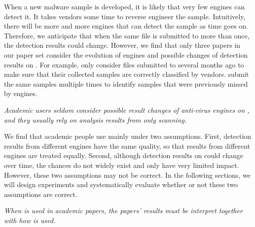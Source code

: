 When a new malware sample is developed, 
it is likely that very few engines can detect it. 
It takes vendors some time to reverse engineer the sample.
Intuitively, there will be more and more engines 
that can detect the sample as time goes on. 
Therefore, we anticipate that when the same file 
is submitted to \vt{} more than once,
the detection results could change. 
However, we find that only three papers in our paper set
consider the evolution of engines and possible 
changes of detection results on \vt{}. 
For example, \citet{neeles} only consider files submitted to \vt{} 
several months ago to make sure that their collected samples 
are correctly classified by \vt{} vendors. 
\citet{wressnegger2017looking} submit the same samples multiple 
times to identify samples that were previously missed by \vt{} engines.  

{\it{
Academic users seldom consider possible 
result changes of anti-virus engines on \vt{}, 
and they usually rely on analysis results from only \vt{} scanning. 
}}

We find that academic people use \vt{} mainly under two assumptions.
First, detection results from different engines have the same quality,
so that results from different engines are treated equally. 
Second, although detection results on \vt{} could change over time, 
the chances do not widely exist and only have very limited impact. 
However, these two assumptions may not be correct. 
In the following sections, we will design experiments and 
systematically evaluate whether or not these two assumptions are correct. 

{\it{
When \vt{} is used in academic papers, the papers' results must be 
interpret together with how \vt{} is used. 
}}

